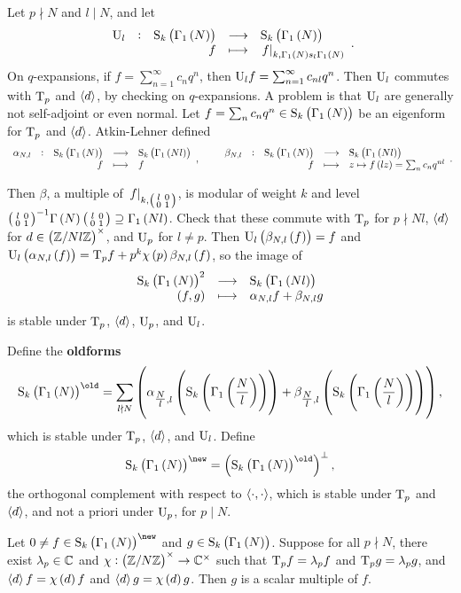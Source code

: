 
Let $ p \nmid N $ and $ l \mid N $, and let
$$ \function[\U_l]{\S_k\br{\Gamma_1\br{N}}}{\S_k\br{\Gamma_1\br{N}}}{f}{\eval{f}_{k, \Gamma_1\br{N}s_l\Gamma_1\br{N}}}. $$
On $ q $-expansions, if $ f = \sum_{n = 1}^\infty c_nq^n $, then $ \mathrm{U}_lf = \sum_{n = 1}^\infty c_{nl}q^n $. Then $ \mathrm{U}_l $ commutes with $ \mathrm{T}_p $ and $ \left\langle d \right\rangle $, by checking on $ q $-expansions. A problem is that $ \mathrm{U}_l $ are generally not self-adjoint or even normal. Let $ f = \sum_n c_nq^n \in \S_k\br{\Gamma_1\br{N}} $ be an eigenform for $ \mathrm{T}_p $ and $ \left\langle d \right\rangle $. Atkin-Lehner defined
$$ \function[\alpha_{N, l}]{\S_k\br{\Gamma_1\br{N}}}{\S_k\br{\Gamma_1\br{Nl}}}{f}{f}, \qquad \function[\beta_{N, l}]{\S_k\br{\Gamma_1\br{N}}}{\S_k\br{\Gamma_1\br{Nl}}}{f}{z \mapsto f\br{lz} = \sum_n c_nq^{nl}}. $$

\pagebreak

Then $ \beta $, a multiple of $ \left. f \right|_{k, \begin{psmallmatrix} l & 0 \\ 0 & 1 \end{psmallmatrix}} $, is modular of weight $ k $ and level $ \twobytwosmall{l}{0}{0}{1}^{-1}\Gamma\br{N}\twobytwosmall{l}{0}{0}{1} \supseteq \Gamma_1\br{Nl} $. Check that these commute with $ \mathrm{T}_p $ for $ p \nmid Nl $, $ \left\langle d \right\rangle $ for $ d \in \br{\ZZ / Nl\ZZ}^\times $, and $ \mathrm{U}_p $ for $ l \ne p $. Then $ \U_l\br{\beta_{N, l}\br{f}} = f $ and $ \U_l\br{\alpha_{N, l}\br{f}} = \T_pf + p^k\chi\br{p}\beta_{N, l}\br{f} $, so the image of
$$ \function{\S_k\br{\Gamma_1\br{N}}^2}{\S_k\br{\Gamma_1\br{Nl}}}{\br{f, g}}{\alpha_{N, l}f + \beta_{N, l}g} $$
is stable under $ \mathrm{T}_p $, $ \left\langle d \right\rangle $, $ \mathrm{U}_p $, and $ \mathrm{U}_l $.

\begin{definition}
Define the \textbf{oldforms}
$$ \S_k\br{\Gamma_1\br{N}}^{\old} = \sum_{l \nmid N} \br{\alpha_{\tfrac{N}{l}, l}\br{\S_k\br{\Gamma_1\br{\dfrac{N}{l}}}} + \beta_{\tfrac{N}{l}, l}\br{\S_k\br{\Gamma_1\br{\dfrac{N}{l}}}}}, $$
which is stable under $ \mathrm{T}_p $, $ \left\langle d \right\rangle $, and $ \mathrm{U}_l $. Define
$$ \S_k\br{\Gamma_1\br{N}}^{\new} = \br{\S_k\br{\Gamma_1\br{N}}^{\old}}^\perp, $$
the orthogonal complement with respect to $ \left\langle \cdot, \cdot \right\rangle $, which is stable under $ \mathrm{T}_p $ and $ \left\langle d \right\rangle $, and not a priori under $ \mathrm{U}_p $, for $ p \mid N $.
\end{definition}

\begin{theorem}
Let $ 0 \ne f \in \S_k\br{\Gamma_1\br{N}}^{\new} $ and $ g \in \S_k\br{\Gamma_1\br{N}} $. Suppose for all $ p \nmid N $, there exist $ \lambda_p \in \mathbb{C} $ and $ \chi : \br{\ZZ / N\ZZ}^\times \to \CC^\times $ such that $ \mathrm{T}_pf = \lambda_pf $ and $ \mathrm{T}_pg = \lambda_pg $, and $ \abr{d}f = \chi\br{d}f $ and $ \abr{d}g = \chi\br{d}g $. Then $ g $ is a scalar multiple of $ f $.
\end{theorem}

